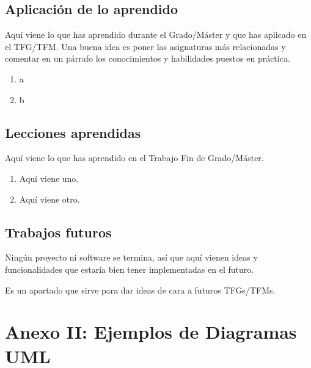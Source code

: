 \documentclass[a4paper, 12pt]{book}
\begin{document}
\section{Aplicación de lo aprendido}
\label{sec:aplicacion}

Aquí viene lo que has aprendido durante el Grado/Máster y que has aplicado en el TFG/TFM. Una buena idea es poner las asignaturas más relacionadas y comentar en un párrafo los conocimientos y habilidades puestos en práctica.

\begin{enumerate}
  \item a
  \item b
\end{enumerate}


\section{Lecciones aprendidas}
\label{sec:lecciones_aprendidas}

Aquí viene lo que has aprendido en el Trabajo Fin de Grado/Máster.

\begin{enumerate}
  \item Aquí viene uno.
  \item Aquí viene otro.
\end{enumerate}


\section{Trabajos futuros}
\label{sec:trabajos_futuros}

Ningún proyecto ni software se termina, así que aquí vienen ideas y funcionalidades que estaría bien tener implementadas en el futuro.

Es un apartado que sirve para dar ideas de cara a futuros TFGs/TFMs.



\cleardoublepage
\appendix


\chapter{Anexo II: Ejemplos de Diagramas UML}
\label{app:diagramas}
\end{document}
